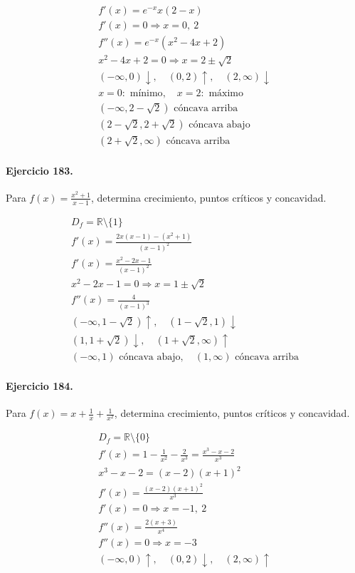 \documentclass[11pt,a4paper]{article}
\begin{document}
\[
\begin{aligned}
f'(x)=e^{-x}x(2-x)\\
f'(x)=0\Rightarrow x=0,\ 2\\
f''(x)=e^{-x}(x^2-4x+2)\\
x^2-4x+2=0\Rightarrow x=2\pm\sqrt2\\
(-\infty,0)\downarrow,\quad(0,2)\uparrow,\quad(2,\infty)\downarrow\\
x=0:\text{{ mínimo}},\quad x=2:\text{{ máximo}}\\
(-\infty,2-\sqrt2)\text{{ cóncava arriba}}\\
(2-\sqrt2,2+\sqrt2)\text{{ cóncava abajo}}\\
(2+\sqrt2,\infty)\text{{ cóncava arriba}}
\end{aligned}
\]


\paragraph{Ejercicio 183.} Para $f(x)=\frac{x^2+1}{x-1}$, determina crecimiento, puntos críticos y concavidad.

\[
\begin{aligned}
D_f=\mathbb{R}\setminus\{1\}\\
f'(x)=\frac{2x(x-1)-(x^2+1)}{(x-1)^2}\\
f'(x)=\frac{x^2-2x-1}{(x-1)^2}\\
x^2-2x-1=0\Rightarrow x=1\pm\sqrt2\\
f''(x)=\frac{4}{(x-1)^3}\\
(-\infty,1-\sqrt2)\uparrow,\quad(1-\sqrt2,1)\downarrow\\
(1,1+\sqrt2)\downarrow,\quad(1+\sqrt2,\infty)\uparrow\\
(-\infty,1)\text{{ cóncava abajo}},\quad(1,\infty)\text{{ cóncava arriba}}
\end{aligned}
\]


\paragraph{Ejercicio 184.} Para $f(x)=x+\frac{1}{x}+\frac{1}{x^2}$, determina crecimiento, puntos críticos y concavidad.

\[
\begin{aligned}
D_f=\mathbb{R}\setminus\{0\}\\
f'(x)=1-\frac{1}{x^2}-\frac{2}{x^3}=\frac{x^3-x-2}{x^3}\\
x^3-x-2=(x-2)(x+1)^2\\
f'(x)=\frac{(x-2)(x+1)^2}{x^3}\\
f'(x)=0\Rightarrow x=-1,\ 2\\
f''(x)=\frac{2(x+3)}{x^4}\\
f''(x)=0\Rightarrow x=-3\\
(-\infty,0)\uparrow,\quad(0,2)\downarrow,\quad(2,\infty)\uparrow
\end{aligned}
\]
\end{document}
